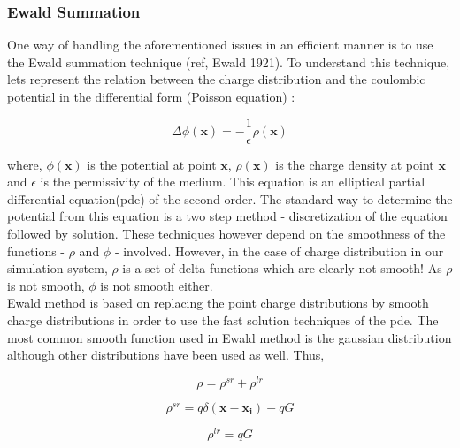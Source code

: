 \documentclass[9pt,bestpractices]{livecoms}
\begin{document}
\subsubsection{ Ewald Summation}

One way of handling the aforementioned issues in an efficient manner is to use the Ewald summation technique (ref, Ewald 1921). To understand this technique, lets represent the relation between the charge distribution and the coulombic potential  in the differential form (Poisson equation) :

\[
\Delta \phi(\boldsymbol{x}) = - \frac{1}{\epsilon} \rho(\boldsymbol{x}) 
\] 

where,   $\phi(\boldsymbol{x})$ is the potential at point $\boldsymbol{x}$, $\rho(\boldsymbol{x})$ is the charge density at point $\boldsymbol{x}$ and $\epsilon$ is the permissivity of the medium. 
This equation is an elliptical partial differential equation(pde) of the second order. 
The standard way to determine the potential from this equation is a two step method - discretization of the equation followed by solution. These techniques however depend on the smoothness of the functions - $\rho$ and $\phi$ - involved. 
However, in the case of charge distribution in our simulation system, $\rho$ is a set of delta functions which are clearly not smooth! 
As $\rho$ is not smooth, $\phi$ is not smooth either. \\

   
Ewald method is based on replacing the point charge distributions by smooth charge distributions in order to use the fast solution techniques of the pde. The most common smooth function used in Ewald method is the gaussian distribution although other distributions have been used as well. Thus,

\[ \rho = \rho^{sr} + \rho^{lr} \]

\[ \rho^{sr} = q\delta(\boldsymbol{x}-\boldsymbol{x_i}) - qG\] 

\[ \rho^{lr} = qG \]
\end{document}

